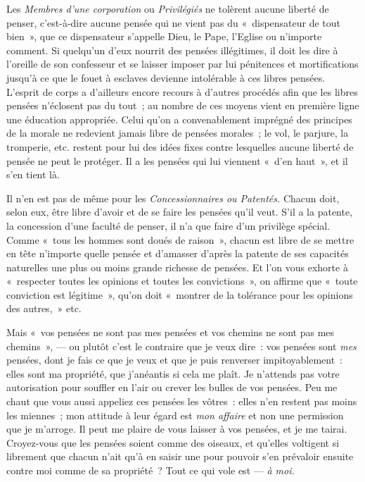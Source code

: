 \documentclass[french,twoside]{book} %
\begin{document}
Les \emph{Membres d’une corporation} ou \emph{Privilégiés} ne tolèrent aucune liberté de penser, c’est-à-dire aucune pensée qui ne vient pas du « dispensateur de tout bien », que ce dispensateur s’appelle Dieu, le Pape,  l’Eglise ou n’importe comment. Si quelqu’un d’eux nourrit des pensées illégitimes, il doit les dire à l’oreille de son confesseur et se laisser imposer par lui pénitences et mortifications jusqu’à ce que le fouet à esclaves devienne intolérable à ces libres pensées. L’esprit de corps a d’ailleurs encore recours à d’autres procédés afin que les libres pensées n’éclosent pas du tout ; au nombre de ces moyens vient en première ligne une éducation appropriée. Celui qu’on a convenablement imprégné des principes de la morale ne redevient jamais libre de pensées morales ; le vol, le parjure, la tromperie, etc. restent pour lui des idées fixes contre lesquelles aucune liberté de pensée ne peut le protéger. Il a les pensées qui lui viennent « d’en haut », et il s’en tient là.\par
Il n’en est pas de même pour les \emph{Concessionnaires ou Patentés.} Chacun doit, selon eux, être libre d’avoir et de se faire les pensées qu’il veut. S’il a la patente, la concession d’une faculté de penser, il n’a que faire d’un privilège spécial. Comme « tous les hommes sont doués de raison », chacun est libre de se mettre en tête n’importe quelle pensée et d’amasser d’après la patente de ses capacités naturelles une plus ou moins grande richesse de pensées. Et l’on vous exhorte à « respecter toutes les opinions et toutes les convictions », on affirme que « toute conviction est légitime », qu’on doit « montrer de la tolérance pour les opinions des autres, » etc.\par
Mais « vos pensées ne sont pas mes pensées et vos chemins ne sont pas mes chemins », — ou plutôt c’est le contraire que je veux dire : vos pensées sont \emph{mes} pensées, dont je fais ce que je veux et que je puis renverser impitoyablement : elles sont ma propriété, que j’anéantis si cela me plaît. Je n’attends pas votre autorisation pour souffler en l’air ou crever les bulles de vos pensées. Peu me chaut que vous aussi appeliez ces pensées les vôtres : elles n’en restent pas moins les miennes ; mon attitude à leur égard est  \emph{mon affaire} et non une permission que je m’arroge. Il peut me plaire de vous laisser à vos pensées, et je me tairai. Croyez-vous que les pensées soient comme des oiseaux, et qu’elles voltigent si librement que chacun n’ait qu’à en saisir une pour pouvoir s’en prévaloir ensuite contre moi comme de sa propriété ? Tout ce qui vole est — \emph{à moi.}\par
\end{document}
